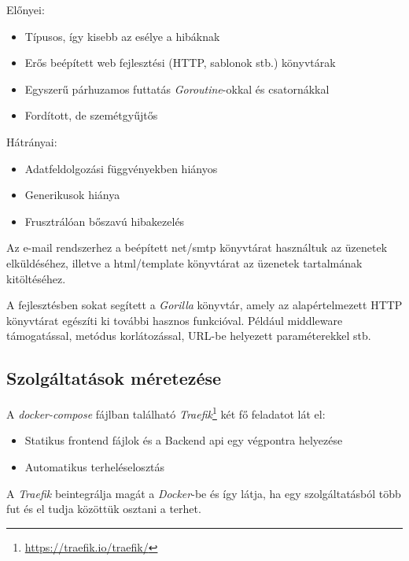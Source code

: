 \begin{samepage}
\noindent Előnyei:
\begin{itemize}
    \item Típusos, így kisebb az esélye a hibáknak
    \item Erős beépített web fejlesztési (HTTP, sablonok stb.) könyvtárak
    \item Egyszerű párhuzamos futtatás \emph{Goroutine}-okkal és csatornákkal
    \item Fordított, de szemétgyűjtős
    
\end{itemize}
\end{samepage}

\begin{samepage}
\noindent Hátrányai:
\begin{itemize}
    \item Adatfeldolgozási függvényekben hiányos
    \item Generikusok hiánya
    \item Frusztrálóan bőszavú hibakezelés
\end{itemize}
\end{samepage}

Az e-mail rendszerhez a beépített net/smtp  könyvtárat használtuk az üzenetek elküldéséhez, illetve a html/template könyvtárat az üzenetek tartalmának kitöltéséhez.

A fejlesztésben sokat segített a \emph{Gorilla} könyvtár, amely az alapértelmezett HTTP könyvtárat egészíti ki további hasznos funkcióval.
Például middleware támogatással, metódus korlátozással, URL-be helyezett paraméterekkel stb.

\subsection{Szolgáltatások méretezése}
A \emph{docker-compose} fájlban található \emph{Traefik}\footnote{\url{https://traefik.io/traefik/}} két fő feladatot lát el:

\begin{samepage}
\begin{itemize}
    \item Statikus frontend fájlok és a Backend api egy végpontra helyezése
    \item Automatikus terheléselosztás
\end{itemize}
\end{samepage}

A \emph{Traefik} beintegrálja magát a \emph{Docker}-be és így látja, ha egy szolgáltatásból több fut és el tudja közöttük osztani a terhet.

